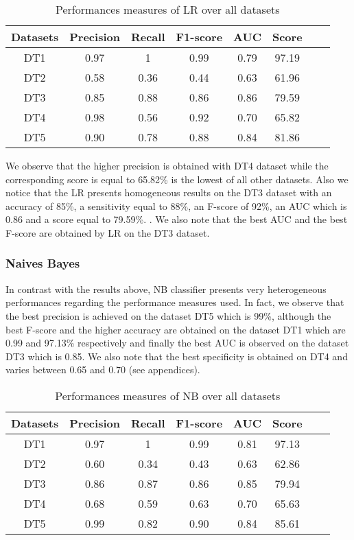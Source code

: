 \begin{table}[!ht]
\centering
\begin{tabular}{*{6}{c}l r}
  \toprule
  \textbf{Datasets} & \textbf{Precision} & \textbf{Recall} & \textbf{F1-score}&\textbf{AUC} &\textbf{Score}\\
   \midrule
  DT1 &0.97 &1   &0.99 &0.79 &97.19 \\
  DT2 & 0.58 &0.36   &0.44&0.63&61.96\\
  DT3 &0.85 &0.88 &0.86&0.86&79.59\\
  DT4 &0.98 &0.56&0.92&0.70&65.82\\
  DT5 & 0.90&0.78&0.88&0.84&81.86\\
  
  
    \bottomrule
\end{tabular}
\caption{Performances measures of LR over all datasets}\label{perf-measure-dt1}
\end{table}
We observe that the higher precision is obtained with DT4 dataset while the corresponding score is equal to 65.82\% is the lowest of all other datasets. Also we notice that the LR presents homogeneous results on the DT3 dataset with an accuracy of 85\%, a sensitivity equal to 88\%, an F-score of 92\%, an AUC which is 0.86 and a score equal to 79.59\%. . We also note that the best AUC and the best F-score are obtained by LR on the DT3 dataset.
\subsubsection{Naives Bayes}
In contrast with the results above, NB classifier presents very heterogeneous performances regarding the performance measures used. In fact, we observe that the best precision is achieved on the dataset DT5 which is 99\%, although the best F-score and the higher accuracy are obtained on the dataset DT1 which are 0.99 and 97.13\% respectively and finally the best AUC is observed on the dataset DT3 which is 0.85. We also note that the best specificity is obtained on DT4 and varies between 0.65 and 0.70 (see appendices).
\begin{table}[!ht]
\centering
\begin{tabular}{*{6}{c}l r}
  \toprule
  \textbf{Datasets} & \textbf{Precision} & \textbf{Recall} & \textbf{F1-score}&\textbf{AUC} &\textbf{Score}\\
   \midrule
  DT1 &0.97 &1   &0.99 &0.81 &97.13 \\
  DT2 & 0.60 &0.34   &0.43&0.63&62.86 \\
  DT3 &0.86 &0.87 &0.86&0.85&79.94\\
  DT4 &0.68 &0.59&0.63&0.70&65.63\\
  DT5 &0.99 &0.82&0.90&0.84&85.61\\
  
  
    \bottomrule
\end{tabular}
\caption{Performances measures of NB over all datasets}\label{perf-measure-dt1}
\end{table}

